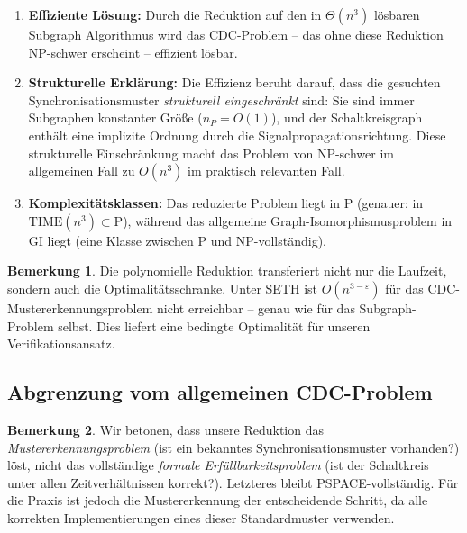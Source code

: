 ﻿\documentclass[a4paper,12pt]{article}
\theoremstyle{definition}
\newtheorem{bemerkung}{Bemerkung}
\begin{document}
	\begin{enumerate}
		\item \textbf{Effiziente L\"osung:} Durch die Reduktion auf den in
		$\Theta(n^3)$ l\"osbaren Subgraph Algorithmus wird das CDC-Problem --
		das ohne diese Reduktion NP-schwer erscheint -- effizient l\"osbar.
		
		\item \textbf{Strukturelle Erkl\"arung:} Die Effizienz beruht darauf,
		dass die gesuchten Synchronisationsmuster \emph{strukturell eingeschr\"ankt}
		sind: Sie sind immer Subgraphen konstanter Gr\"o\ss{}e ($n_P = O(1)$),
		und der Schaltkreisgraph enth\"alt eine implizite Ordnung durch die
		Signalpropagationsrichtung. Diese strukturelle Einschr\"ankung macht
		das Problem von NP-schwer im allgemeinen Fall zu $O(n^3)$ im
		praktisch relevanten Fall.
		
		\item \textbf{Komplexit\"atsklassen:} Das reduzierte Problem liegt in P
		(genauer: in $\mathrm{TIME}(n^3) \subset \mathrm{P}$),
		w\"ahrend das allgemeine Graph-Isomorphismusproblem in GI liegt
		(eine Klasse zwischen P und NP-vollst\"andig).
	\end{enumerate}
	
	\begin{bemerkung}
		Die polynomielle Reduktion transferiert nicht nur die Laufzeit,
		sondern auch die Optimalit\"atsschranke. Unter SETH ist
		$O(n^{3-\varepsilon})$ f\"ur das CDC-Mustererkennungspro\-blem nicht
		erreichbar -- genau wie f\"ur das Subgraph-Problem selbst.
		Dies liefert eine bedingte Optimalit\"at f\"ur unseren Verifikationsansatz.
	\end{bemerkung}
	
	\subsection{Abgrenzung vom allgemeinen CDC-Problem}
	
	\begin{bemerkung}
		Wir betonen, dass unsere Reduktion das \emph{Mustererkennungsproblem}
		(ist ein bekanntes Synchronisationsmuster vorhanden?) l\"ost, nicht
		das vollst\"andige \emph{formale Erf\"ullbarkeitsproblem} (ist der Schaltkreis
		unter allen Zeitverh\"altnissen korrekt?). Letzteres bleibt PSPACE-vollst\"andig.
		F\"ur die Praxis ist jedoch die Mustererkennung der entscheidende Schritt,
		da alle korrekten Implementierungen eines dieser Standardmuster verwenden.
	\end{bemerkung}
	
\end{document}
